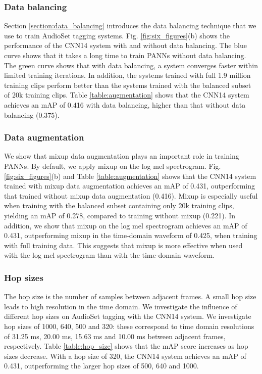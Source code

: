 \documentclass[journal]{IEEEtran}
\newcommand{\qk}[1] {{\color{black} #1}}
\begin{document}
\qk{\subsubsection{Data balancing}
Section \ref{section:data_balancing} introduces the data balancing technique that we use to train AudioSet tagging systems. Fig. \ref{fig:six_figures}(b) shows the performance of the CNN14 system with and without data balancing. The blue curve shows that it takes a long time to train PANNs without data balancing. The green curve shows that with data balancing, a system converges faster within limited training iterations. In addition, the systems trained with full 1.9 million training clips perform better than the systems trained with the balanced subset of 20k training clips. Table \ref{table:augmentation} shows that the CNN14 system achieves an mAP of 0.416 with data balancing, higher than that without data balancing (0.375). 



\subsubsection{Data augmentation}\label{section:exp_augmentation}
We show that mixup data augmentation plays an important role in training PANNs. By default, we apply mixup on the log mel spectrogram. Fig. \ref{fig:six_figures}(b) and Table \ref{table:augmentation} shows that the CNN14 system trained with mixup data augmentation achieves an mAP of 0.431, outperforming that trained without mixup data augmentation (0.416). Mixup is especially useful when training with the balanced subset containing only 20k training clips, yielding an mAP of 0.278, compared to training without mixup (0.221). In addition, we show that mixup on the log mel spectrogram achieves an mAP of 0.431, outperforming mixup in the time-domain waveform of 0.425, when training with full training data. This suggests that mixup is more effective when used with the log mel spectrogram than with the time-domain waveform.}


\subsubsection{Hop sizes}
The hop size is the number of samples between adjacent frames. A small hop size leads to high resolution in the time domain. We investigate the influence of different hop sizes on AudioSet tagging with the CNN14 system. We investigate hop sizes of 1000, 640, 500 and 320: these correspond to time domain resolutions of 31.25 ms, 20.00 ms, 15.63 ms and 10.00 ms between adjacent frames, respectively. Table \ref{table:hop_size} shows that the mAP score increases as hop sizes decrease. With a hop size of 320, the CNN14 system achieves an mAP of 0.431, outperforming the larger hop sizes of 500, 640 and 1000.  
\end{document}
